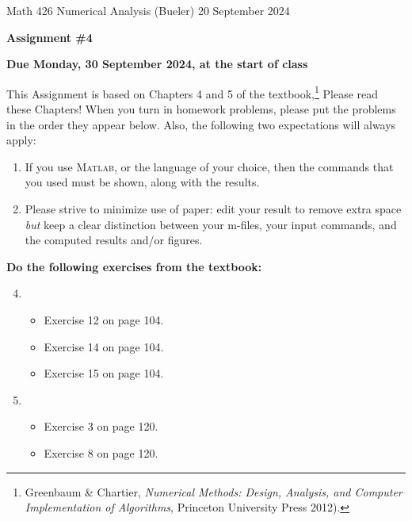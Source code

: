 \documentclass[12pt]{amsart}
\newcommand{\Matlab}{\textsc{Matlab}\xspace}
\begin{document}
\scriptsize \noindent Math 426 Numerical Analysis (Bueler) \hfill 20 September 2024
\normalsize

\medskip\bigskip

\Large\centerline{\textbf{Assignment \#4}}
\large
\bigskip

\centerline{\textbf{Due Monday, 30 September 2024, at the start of class}}
\bigskip
\normalsize

\thispagestyle{empty}

This Assignment is based on Chapters 4 and 5 of the textbook,\footnote{Greenbaum \& Chartier, \emph{Numerical Methods: Design, Analysis, and Computer Implementation of Algorithms}, Princeton University Press 2012).}  Please read these Chapters!  When you turn in homework problems, please put the problems in the order they appear below.  Also, the following two expectations will always apply:
\renewcommand{\labelenumi}{\arabic{enumi}.\,}
\begin{enumerate}
\item If you use \Matlab, or the language of your choice, then the commands that you used must be shown, along with the results.
\item Please strive to minimize use of paper: edit your result to remove extra space \emph{but} keep a clear distinction between your m-files, your input commands, and the computed results and/or figures.
\end{enumerate}

\bigskip\bigskip
\noindent \textbf{Do the following exercises from the textbook:}

\medskip
\renewcommand{\labelenumi}{{\footnotesize\underline{\textsc{Chapter \arabic{enumi}}}}}
\begin{enumerate}
\setcounter{enumi}{3}
\item ~
    \begin{itemize}
    \item Exercise 12 on page 104.
    \item Exercise 14 on page 104.
    \item Exercise 15 on page 104.
    \end{itemize}
\item ~
    \begin{itemize}
    \item Exercise 3 on page 120.
    \item Exercise 8 on page 120.
    \end{itemize}
\end{enumerate}
\end{document}
